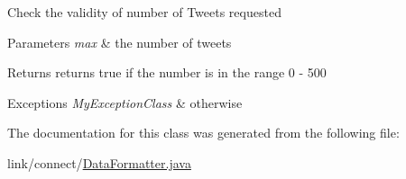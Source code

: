 Check the validity of number of Tweets requested 
\begin{DoxyParams}{Parameters}
{\em max} & the number of tweets \\
\hline
\end{DoxyParams}
\begin{DoxyReturn}{Returns}
returns true if the number is in the range 0 -\/ 500 
\end{DoxyReturn}

\begin{DoxyExceptions}{Exceptions}
{\em My\+Exception\+Class} & otherwise \\
\hline
\end{DoxyExceptions}


The documentation for this class was generated from the following file\+:\begin{DoxyCompactItemize}
\item 
link/connect/\hyperlink{_data_formatter_8java}{Data\+Formatter.\+java}\end{DoxyCompactItemize}
